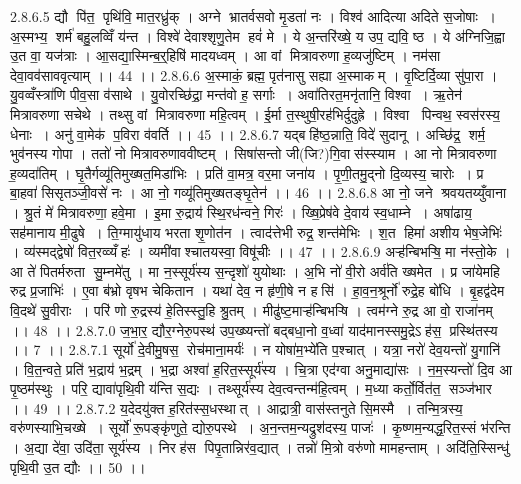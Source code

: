 2.8.6.5
द्यौ पि॑त॒ पृथि॑वि॒ मात॒रध्रु॑क् । अग्ने भ्रातर्वसवो मृ॒डता॑ नः । विश्व॑ आदित्या अदिते स॒जोषाः । अ॒स्मभ्य॒॒ शर्म॑ बहु॒लव्विँ य॑न्त । विश्वे॑ देवाश्शृणु॒तेम हवं॑ मे । ये अ॒न्तरि॑ख्षे॒ य उप॒ द्यवि॒ ष्ठ । ये अ॑ग्निजि॒ह्वा उ॒त वा॒ यज॑त्राः । आ॒सद्या॒स्मिन्ब॒र्॒हिषि॑ मादयध्वम् । आ वां मित्रावरुणा ह॒व्यजु॑ष्टिम् । नम॑सा देवा॒वव॑साववृत्याम् ।। 44 ।।
2.8.6.6
अ॒स्माकं॒ ब्रह्म॒ पृत॑नासु सह्या अ॒स्माकम् । वृ॒ष्टिर्दि॒व्या सु॑पा॒रा । यु॒वव्वँस्त्रा॑णि पीव॒सा व॑साथे । यु॒वोरच्छि॑द्रा॒ मन्त॑वो ह॒ सर्गाः । अवा॑तिरत॒मनृ॑तानि॒ विश्वा । ऋ॒तेन॑ मित्रावरुणा सचेथे । तथ्सु वां मित्रावरुणा महि॒त्वम् । ई॒र्मा त॒स्थुषी॒रह॑भिर्दुदुह्रे । विश्वा पिन्वथ॒ स्वस॑रस्य॒ धेनाः । अनु॑ वा॒मेक॑ प॒विरा व॑वर्ति ।। 45 ।।
2.8.6.7
यद्बहि॑ष्ठ॒न्नाति॒ विदे॑ सुदानू । अच्छि॑द्र॒॒ शर्म॒ भुव॑नस्य गोपा । ततो॑ नो मित्रावरुणाववीष्टम् । सिषा॑सन्तो जी(जि?)गि॒वास॑स्स्याम । आ नो मित्रावरुणा ह॒व्यदा॑तिम् । घृ॒तैर्गव्यू॑तिमुख्षत॒मिडा॑भिः । प्रति॑ वा॒मत्र॒ वर॒मा जना॑य । पृ॒णी॒तमु॒द्नो दि॒व्यस्य॒ चारोः । प्र बा॒हवा॑ सिसृतञ्जी॒वसे॑ नः । आ नो॒ गव्यू॑तिमुख्षतङ्घृ॒तेन॑ ।। 46 ।।
2.8.6.8
आ नो॒ जने श्रवयतय्युँवाना । श्रु॒तं मे॑ मित्रावरुणा॒ हवे॒मा । इ॒मा रु॒द्राय॑ स्थि॒रध॑न्वने॒ गिरः॑ । ख्षि॒प्रेष॑वे दे॒वाय॑ स्व॒धाम्ने । अषा॑ढाय॒ सह॑मानाय मी॒ढुषे । ति॒ग्मायु॑धाय भरता शृ॒णोत॑न । त्वाद॑त्तेभी रुद्र॒ शन्त॑मेभिः । श॒त हिमा॑ अशीय भेष॒जेभिः॑ । व्य॑स्मद्द्वेषो॑ वित॒रव्व्यँहः॑ । व्यमी॑वाश्चातयस्वा॒ विषू॑चीः ।। 47 ।।
2.8.6.9
अऱ्ह॑न्बिभऱ्षि॒ मा न॑स्तो॒के । आ ते॑ पितर्मरुता सु॒म्नमे॑तु । मा न॒स्सूर्य॑स्य स॒न्दृशो॑ युयोथाः । अ॒भि नो॑ वी॒रो अर्व॑ति ख्षमेत । प्र जा॑येमहि रुद्र प्र॒जाभिः॑ । ए॒वा ब॑भ्रो वृषभ चेकितान । यथा॑ देव॒ न हृ॑णी॒षे न हसि॑ । हा॒व॒न॒श्रूर्नो॑ रुद्रे॒ह बो॑धि । बृ॒हद्व॑देम वि॒दथे॑ सु॒वीराः । परि॑ णो रु॒द्रस्य॑ हे॒तिस्स्तु॒हि श्रु॒तम् । मीढु॑ष्ट॒माऱ्ह॑न्बिभऱ्षि । त्वम॑ग्ने रु॒द्र आ वो॒ राजा॑नम् ।। 48 ।।
2.8.7.0
ज॒भा॒र॒ द्यौर॒ग्नेरु॒पस्थ॑ उप॒ख्ष्यन्तो॑ बद्बधा॒नो व॒ध्वा॑ याद॑मानस्समु॒द्रेऽह॑स॒ प्रस्थि॑तस्य ।। 7 ।।
2.8.7.1
सूर्यो॑ दे॒वीमु॒षस॒॒ रोच॑माना॒मर्यः॑ । न योषा॑म॒भ्ये॑ति प॒श्चात् । यत्रा॒ नरो॑ देव॒यन्तो॑ यु॒गानि॑ । वि॒त॒न्वते॒ प्रति॑ भ॒द्राय॑ भ॒द्रम् । भ॒द्रा अश्वा॑ ह॒रित॒स्सूर्य॑स्य । चि॒त्रा एद॑ग्वा अनु॒माद्या॑सः । न॒म॒स्यन्तो॑ दि॒व आ पृ॒ष्ठम॑स्थुः । परि॒ द्यावा॑पृथि॒वी य॑न्ति स॒द्यः । तथ्सूर्य॑स्य देव॒त्वन्तन्म॑हि॒त्वम् । म॒ध्या कर्तो॒र्वित॑त॒॒ सञ्ज॑भार ।। 49 ।।
2.8.7.2
य॒देदयु॑क्त ह॒रित॑स्स॒धस्थात् । आद्रात्री॒ वास॑स्तनुते सि॒मस्मै । तन्मि॒त्रस्य॒ वरु॑णस्याभि॒चख्षे । सूर्यो॑ रू॒पङ्कृ॑णुते॒ द्योरु॒पस्थे । अ॒न॒न्तम॒न्यद्रुश॑दस्य॒ पाजः॑ । कृ॒ष्णम॒न्यद्ध॒रित॒स्सं भ॑रन्ति । अ॒द्या दे॑वा॒ उदि॑ता॒ सूर्य॑स्य । निरह॑स पिपृ॒तान्निर॑व॒द्यात् । तन्नो॑ मि॒त्रो वरु॑णो मामहन्ताम् । अदि॑ति॒स्सिन्धु॑ पृथि॒वी उ॒त द्यौः ।। 50 ।।
